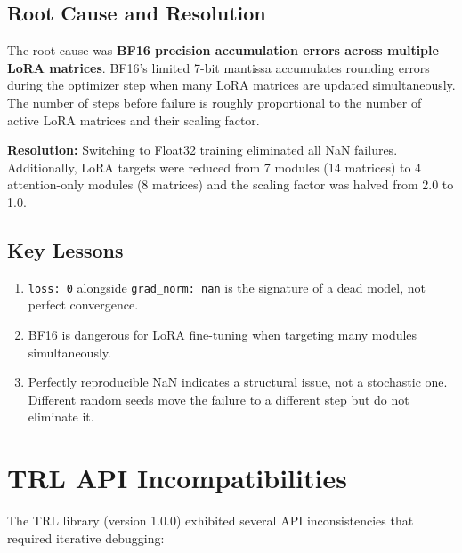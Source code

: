 \documentclass[12pt]{report}
\begin{document}
\subsection{Root Cause and Resolution}

The root cause was \textbf{BF16 precision accumulation errors across multiple LoRA matrices}. BF16's limited 7-bit mantissa accumulates rounding errors during the optimizer step when many LoRA matrices are updated simultaneously. The number of steps before failure is roughly proportional to the number of active LoRA matrices and their scaling factor.

\textbf{Resolution:} Switching to Float32 training eliminated all NaN failures. Additionally, LoRA targets were reduced from 7 modules (14 matrices) to 4 attention-only modules (8 matrices) and the scaling factor was halved from 2.0 to 1.0.

\subsection{Key Lessons}

\begin{enumerate}
    \item \texttt{loss: 0} alongside \texttt{grad\_norm: nan} is the signature of a dead model, not perfect convergence.
    \item BF16 is dangerous for LoRA fine-tuning when targeting many modules simultaneously.
    \item Perfectly reproducible NaN indicates a structural issue, not a stochastic one. Different random seeds move the failure to a different step but do not eliminate it.
\end{enumerate}

\section{TRL API Incompatibilities}

The TRL library (version 1.0.0) exhibited several API inconsistencies that required iterative debugging:
\end{document}
